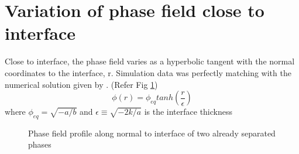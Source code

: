\documentclass[11pt]{article}
\begin{document}
\section{Variation of phase field close to interface}
Close to interface, the phase field varies as a hyperbolic tangent with the normal coordinates to the interface, r. Simulation data was perfectly matching with the numerical solution given by \cite{arXiv:1104.0078}. (Refer Fig \ref*{fig:tanh}) \newline
\begin{equation}
	\phi(r) = \phi_{eq}tan h(\frac{r}{\epsilon})
\end{equation}
where $\phi_{eq} = \sqrt{-a/b}$ and $\epsilon \equiv \sqrt{-2k/a}$ is the interface thickness
\begin{figure}[h!]
	\begin{center}
		\caption{Phase field profile along normal to interface of two already separated phases }
		\label{fig:tanh}
	\end{center}

\end{figure}
\end{document}
